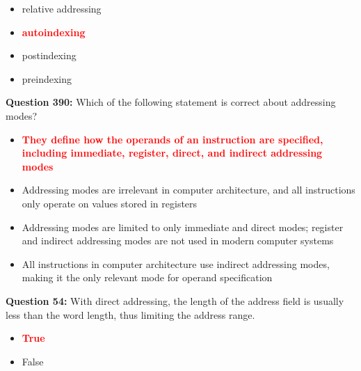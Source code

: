 \documentclass[12pt,a4paper]{article}
\begin{document}
\begin{itemize}
    \item[\textbf{A.}] relative addressing
    \item[\textbf{B.}] \textcolor{red}{\textbf{autoindexing}}
    \item[\textbf{C.}] postindexing
    \item[\textbf{D.}] preindexing
\end{itemize}

\vspace{0.5cm}

\vspace{0.5cm}

\textbf{Question 390:} Which of the following statement is correct about addressing modes?

\begin{itemize}
    \item[\textbf{A.}] \textcolor{red}{\textbf{They define how the operands of an instruction are specified, including immediate, register, direct, and indirect addressing modes}}
    \item[\textbf{B.}] Addressing modes are irrelevant in computer architecture, and all instructions only operate on values stored in registers
    \item[\textbf{C.}] Addressing modes are limited to only immediate and direct modes; register and indirect addressing modes are not used in modern computer systems
    \item[\textbf{D.}] All instructions in computer architecture use indirect addressing modes, making it the only relevant mode for operand specification
\end{itemize}

\vspace{0.5cm}

\vspace{0.5cm}

\textbf{Question 54:} With direct addressing, the length of the address field is usually less than the word length, thus limiting the address range.

\begin{itemize}
    \item[\textbf{A.}] \textcolor{red}{\textbf{True}}
    \item[\textbf{B.}] False
\end{itemize}

\vspace{0.5cm}

\vspace{0.5cm}
\end{document}
